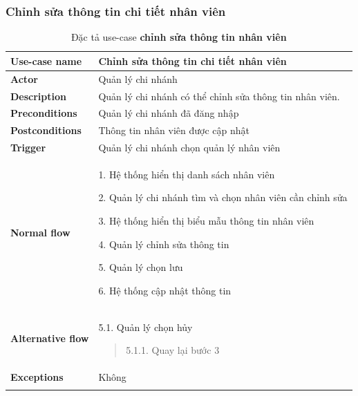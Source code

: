 \subsubsection{Chỉnh sửa thông tin chi tiết nhân viên}
{
    \setlength\extrarowheight{6pt}
    \begin{longtable}{| p{} | p{} |}
        \hline
        \textbf{Use-case name}
         &
        Chỉnh sửa thông tin chi tiết nhân viên
        \\
        \hline
        \textbf{Actor}
         &
        Quản lý chi nhánh
        \\
        \hline
        \textbf{Description}
         &
        Quản lý chi nhánh có thể chỉnh sửa thông tin nhân viên.
        \\
        \hline
        \textbf{Preconditions}
         &
        Quản lý chi nhánh đã đăng nhập
        \\
        \hline
        \textbf{Postconditions}
         &
        Thông tin nhân viên được cập nhật
        \\
        \hline
        \textbf{Trigger}
         &
        Quản lý chi nhánh chọn quản lý nhân viên
        \\
        \hline
        \begin{flushleft}
            \textbf{Normal flow}
        \end{flushleft}
         &
        1. Hệ thống hiển thị danh sách  nhân viên

        2. Quản lý chi nhánh tìm và chọn nhân viên cần chỉnh sửa

        3. Hệ thống hiển thị biểu mẫu thông tin nhân viên

        4. Quản lý chỉnh sửa thông tin

        5. Quản lý chọn lưu

        6. Hệ thống cập nhật thông tin
        \\
        \hline
        \begin{flushleft}
            \textbf{Alternative flow}
        \end{flushleft}
         &
        5.1. Quản lý chọn hủy
        \begin{quote}
            5.1.1. Quay lại bước 3
        \end{quote}
        \\
        \hline
        \textbf{Exceptions}
         &
        Không
        \\
        \hline
        \caption{Đặc tả use-case \textbf{chỉnh sửa thông tin nhân viên}}
    \end{longtable}
}


